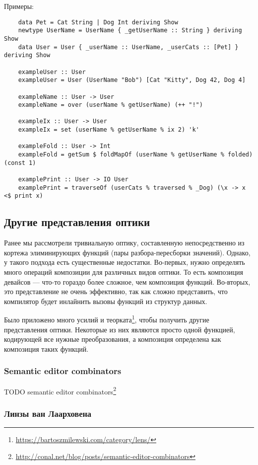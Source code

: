 Примеры:
\begin{verbatim}
    data Pet = Cat String | Dog Int deriving Show
    newtype UserName = UserName { _getUserName :: String } deriving Show
    data User = User { _userName :: UserName, _userCats :: [Pet] } deriving Show

    exampleUser :: User
    exampleUser = User (UserName "Bob") [Cat "Kitty", Dog 42, Dog 4]

    exampleName :: User -> User
    exampleName = over (userName % getUserName) (++ "!")

    exampleIx :: User -> User
    exampleIx = set (userName % getUserName % ix 2) 'k'

    exampleFold :: User -> Int
    exampleFold = getSum $ foldMapOf (userName % getUserName % folded) (const 1)

    examplePrint :: User -> IO User
    examplePrint = traverseOf (userCats % traversed % _Dog) (\x -> x <$ print x)
\end{verbatim}

\subsection{Другие представления оптики}

Ранее мы рассмотрели тривиальную оптику, составленную непосредственно из кортежа элиминирующих функций (пары разбора-пересборки значений).
Однако, у такого подхода есть существенные недостатки.
Во-первых, нужно определять много операций композиции для различных видов оптики.
То есть композиция девайсов --- что-то гораздо более сложное, чем композиция функций.
Во-вторых, это представление не очень эффективно, так как сложно представить, что компилятор будет инлайнить вызовы функций из структур данных.

Было приложено много усилий и теорката\footnote{\url{https://bartoszmilewski.com/category/lens/}}, чтобы получить другие представления оптики.
Некоторые из них являются просто одной функцией, кодирующей все нужные преобразования, а композиция определена как композиция таких функций.

\subsubsection{Semantic editor combinators}

TODO semantic editor combinators\footnote{\url{http://conal.net/blog/posts/semantic-editor-combinators}} %

\subsubsection{Линзы ван Лаарховена}

